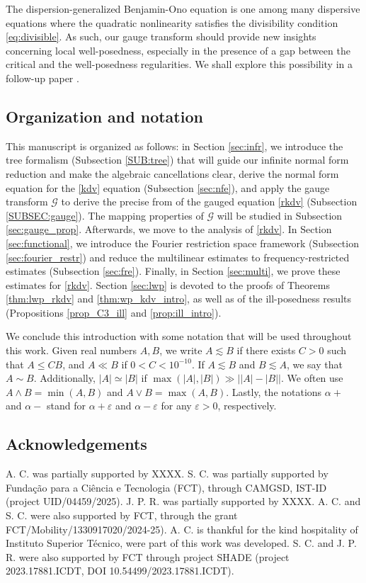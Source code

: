 \documentclass[%
11pt,  reqno]{amsart}
\newcommand{\5}{\textup{V}}
\newcommand{\les}{\lesssim}
\newcommand{\eps}{\varepsilon}
\theoremstyle{remark}
\newcommand{\al}{\alpha}
\newcommand{\Gc}{\mathcal{G}}
\numberwithin{equation}{section}
\numberwithin{theorem}{section}
\begin{document}
\bigskip

The dispersion-generalized Benjamin-Ono equation is one among many dispersive equations where the quadratic nonlinearity satisfies the divisibility condition \eqref{eq:divisible}. As such, our gauge transform should provide new insights concerning local well-posedness, especially in the presence of a gap between the critical and the well-posedness regularities. We shall explore this possibility in a follow-up paper \cite{CCR-NV}.

\subsection{Organization and notation} This manuscript is organized as follows: in Section \ref{sec:infr}, we introduce the tree formalism (Subsection \ref{SUB:tree}) that will guide our infinite normal form reduction and make the algebraic cancellations clear, derive the normal form equation for the \eqref{kdv} equation (Subsection \ref{sec:nfe}), and apply the gauge transform $\Gc$ to derive the precise from of the gauged equation \ref{rkdv} (Subsection \ref{SUBSEC:gauge}). The mapping properties of $\Gc$ will be studied in Subsection \ref{sec:gauge_prop}. Afterwards, we move to the analysis of \eqref{rkdv}. In Section \ref{sec:functional}, we introduce the Fourier restriction space framework (Subsection \ref{sec:fourier_restr}) and reduce the multilinear estimates to frequency-restricted estimates (Subsection \ref{sec:fre}). Finally, in Section \ref{sec:multi}, we prove these estimates for \eqref{rkdv}. Section \ref{sec:lwp} is devoted to the proofs of Theorems \ref{thm:lwp_rkdv} and \ref{thm:wp_kdv_intro}, as well as of the ill-posedness results (Propositions \ref{prop_C3_ill} and \ref{prop:ill_intro}).

\bigskip

We conclude this introduction with some notation that will be used throughout this work. Given real numbers $A,B$, we write $A \les B$ if there exists $C>0$ such that $A \le CB$, and $A \ll B$ if $0<C< 10^{-10}$. If $A\les B$ and $B\les A$, we say that $A\sim B$. Additionally, $|A| \simeq |B|$ if $\max(|A|,|B|) \gg \big| |A| - |B| \big|$. 
We often use $A \land B = \min(A,B)$ and $A \lor B = \max(A,B)$. 
Lastly, 
the notations $\al +$ and $\al-$ stand for $\al+\eps$ and $\al-\eps$ for any $\eps>0$, respectively. 

\subsection{Acknowledgements} A. C. was partially supported by XXXX. S. C. was partially supported by Funda\c{c}\~ao para a Ci\^encia e Tecnologia (FCT), through CAMGSD, IST-ID (project UID/04459/2025). J. P. R.  was partially supported by XXXX. A. C. and S. C. were also supported by FCT, through the grant FCT/Mobility/1330917020/2024-25). A. C. is thankful for the kind hospitality of Instituto Superior Técnico, were part of this work was developed. S. C. and J. P. R. were also supported by FCT through project SHADE (project 2023.17881.ICDT, DOI  10.54499/2023.17881.ICDT).
\end{document}
